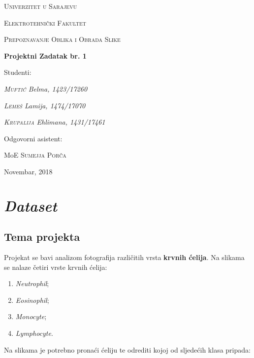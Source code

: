 \documentclass[12pt,a4paper]{article}
\begin{document}
\begin{titlepage}
	\centering
	{\scshape Univerzitet u Sarajevu \par}
	{\scshape Elektrotehnički Fakultet \par}
	\vspace{1cm}
	{\Large\scshape Prepoznavanje Oblika i Obrada Slike\par}
	\vspace{1.5cm}
	{\huge\bfseries Projektni Zadatak br. 1\par}
	\vspace{2cm}
	\Large Studenti: \par
	{\Large\itshape \textsc{Muftić} Belma, 1423/17260\par}
	{\Large\itshape \textsc{Lemeš} Lamija, 1474/17070\par}
	{\Large\itshape \textsc{Krupalija} Ehlimana, 1431/17461\par}
	\vfill
	Odgovorni asistent:\par
	MoE \textsc{Sumejja Porča}
	\vfill
	{\large Novembar, 2018\par}
\end{titlepage}


\tableofcontents

\newpage

\setcounter{page}{1}

\section{\textit{Dataset}}

\subsection{Tema projekta}

Projekat se bavi analizom fotografija različitih vrsta \textbf{krvnih ćelija}. Na slikama se nalaze četiri vrste krvnih ćelija:

\begin{enumerate}

\item \textit{Neutrophil};
\item \textit{Eosinophil};
\item \textit{Monocyte};
\item \textit{Lymphocyte}.

\end{enumerate}

Na slikama je potrebno pronaći ćeliju te odrediti kojoj od sljedećih klasa pripada:
\end{document}
